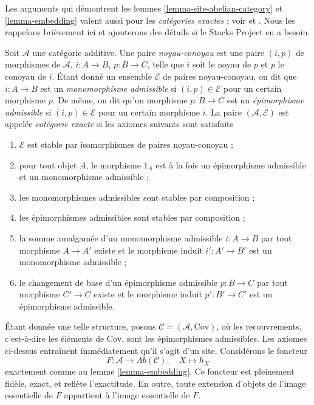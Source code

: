 \begin{remark}
\label{remark-embed-exact-category}
Les arguments qui démontrent les lemmes
\ref{lemma-site-abelian-category} et \ref{lemma-embedding} valent aussi pour
les {\it catégories exactes} ; voir \cite[Appendix A]{Buhler} et
\cite[1.1.4]{BBD}. Nous les rappelons brièvement ici et ajouterons des détails
si le Stacks Project en a besoin.

\medskip\noindent
Soit $\mathcal{A}$ une catégorie additive. Une paire {\it noyau-conoyau} est
une paire $(i, p)$ de morphismes de $\mathcal{A}$,
$i : A \to B$, $p : B \to C$, telle que $i$ soit le noyau de $p$ et $p$ le
conoyau de $i$. Étant donné un ensemble $\mathcal{E}$ de paires
noyau-conoyau, on dit que $i : A \to B$ est un
{\it monomorphisme admissible} si $(i, p) \in \mathcal{E}$ pour un certain
morphisme $p$. De même, on dit qu'un morphisme $p : B \to C$ est un
{\it épimorphisme admissible} si $(i, p) \in \mathcal{E}$ pour un certain
morphisme $i$. La paire $(\mathcal{A}, \mathcal{E})$ est appelée
{\it catégorie exacte} si les axiomes suivants sont satisfaits
\begin{enumerate}
\item $\mathcal{E}$ est stable par isomorphismes de paires noyau-conoyau ;
\item pour tout objet $A$, le morphisme $1_A$ est à la fois un épimorphisme
admissible et un monomorphisme admissible ;
\item les monomorphismes admissibles sont stables par composition ;
\item les épimorphismes admissibles sont stables par composition ;
\item la somme amalgamée d'un monomorphisme admissible $i : A \to B$ par tout
morphisme $A \to A'$ existe et le morphisme induit $i' : A' \to B'$ est un
monomorphisme admissible ;
\item le changement de base d'un épimorphisme admissible $p : B \to C$ par
tout morphisme $C' \to C$ existe et le morphisme induit $p' : B' \to C'$ est
un épimorphisme admissible.
\end{enumerate}
Étant donnée une telle structure, posons
$\mathcal{C} = (\mathcal{A}, \text{Cov})$, où les recouvrements, c'est-à-dire
les éléments de $\text{Cov}$, sont les épimorphismes admissibles. Les axiomes
ci-dessus entraînent immédiatement qu'il s'agit d'un site. Considérons le
foncteur
$$
F : \mathcal{A} \longrightarrow \textit{Ab}(\mathcal{C}), \quad
X \longmapsto h_X
$$
exactement comme au lemme \ref{lemma-embedding}. Ce foncteur est pleinement
fidèle, exact, et reflète l'exactitude. En outre, toute extension d'objets de
l'image essentielle de $F$ appartient à l'image essentielle de $F$.
\end{remark}






